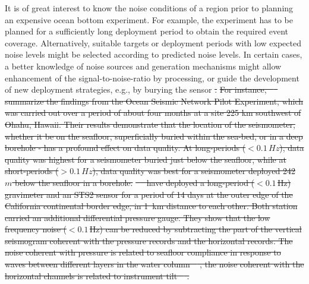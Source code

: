\documentclass{article}
\providecommand{\DIFadd}[1]{{\protect\color{blue}\uwave{#1}}} %
\providecommand{\DIFdel}[1]{{\protect\color{red}\sout{#1}}}                      %
\providecommand{\DIFaddbegin}{} %
\providecommand{\DIFaddend}{} %
\providecommand{\DIFdelbegin}{} %
\providecommand{\DIFdelend}{} %
\begin{document}
{It is of great interest to know the noise 
conditions of a region prior to planning an expensive ocean 
bottom experiment.   
For example, the experiment has to be planned for a sufficiently
long deployment period to obtain the required event
coverage. Alternatively, suitable targets or deployment periods with
low expected noise levels might be selected according to predicted
noise levels. In certain cases, a better knowledge of noise sources and
generation mechanisms might allow enhancement of the
signal-to-noise-ratio by processing, or guide the development of new
deployment strategies, e.g., by burying the sensor \DIFdelbegin \DIFdel{.
}%
\DIFdel{For instance, 
\mbox{%
\cite{collins:01}  }%
summarize the findings from the 
Ocean Seismic Network Pilot Experiment, which was carried out 
over a period of about four months at a site 225 km southwest 
of Ohahu, Hawaii.
Their results demonstrate that the location of the seismometer, whether 
it be on the seafloor, superficially buried within the sea-bed, 
or in a deep borehole - has a profound effect on data quality.
At long-periods ($< 0.1\, Hz$), data quality was highest 
for a seismometer buried just below the seafloor, while at 
short-periods ($>0.1 \, Hz$), data quality was best for a seismometer
deployed 242 $m$ below the seafloor in a borehole.  
}%
\DIFdel{\mbox{%
\cite{crawford:00} }%
have deployed a long-period ($<0.1\, $Hz)
gravimeter and an STS2 sensor for a period of 14 days 
at the outer edge of the California continental border edge,
in 1~km distance to each other. 
Both station carried an additional differential pressure gauge.
They show that the low frequency noise ($<0.1\, $Hz) 
can be reduced by subtracting the part of the vertical seismogram 
coherent with the pressure records and the horizontal records. The
noise coherent with pressure is related to seafloor
compliance in response to waves between different layers in the water
column \mbox{%
\cite[][]{webb:99}}%
, the noise coherent with the horizontal channels 
is related to instrument tilt \mbox{%
\cite[e.g.][]{crawford:00}}%
.
}\DIFdelend \DIFaddbegin \DIFadd{\mbox{%
\cite[e.g.,][]{collins:01}}%
.
}\DIFaddend 

}
\end{document}
